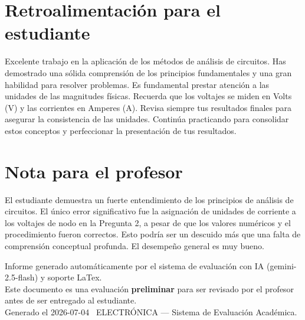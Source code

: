 \documentclass[11pt,a4paper]{article}
\begin{document}
\section*{Retroalimentación para el estudiante}
\begin{tcolorbox}[cajaRecomendacion, title={Dirigido a: Saul Astudillo}]
Excelente trabajo en la aplicación de los métodos de análisis de circuitos. Has demostrado una sólida comprensión de los principios fundamentales y una gran habilidad para resolver problemas. Es fundamental prestar atención a las unidades de las magnitudes físicas. Recuerda que los voltajes se miden en Volts (V) y las corrientes en Amperes (A). Revisa siempre tus resultados finales para asegurar la consistencia de las unidades. Continúa practicando para consolidar estos conceptos y perfeccionar la presentación de tus resultados.
\end{tcolorbox}

\section*{Nota para el profesor}
\begin{tcolorbox}[
  enhanced, breakable,
  colback=yellow!8, colframe=yellow!60!black,
  fonttitle=\bfseries, coltitle=black,
  title={Observaciones para revisión manual},
  top=4pt, bottom=4pt, left=8pt, right=8pt,
]
El estudiante demuestra un fuerte entendimiento de los principios de análisis de circuitos. El único error significativo fue la asignación de unidades de corriente a los voltajes de nodo en la Pregunta 2, a pesar de que los valores numéricos y el procedimiento fueron correctos. Esto podría ser un descuido más que una falta de comprensión conceptual profunda. El desempeño general es muy bueno.
\end{tcolorbox}

\vspace{12pt}
\begin{center}
  \footnotesize\color{gray}
  Informe generado automáticamente por el sistema de evaluación con IA (gemini-2.5-flash) y soporte LaTex. \\
  Este documento es una evaluación \textbf{preliminar} para ser revisado por el profesor antes de ser entregado al 
  estudiante. \\
  Generado el 2026-07-04 \textbullet\ ELECTRÓNICA --- Sistema de Evaluación Académica.
  \end{center}
\end{document}
